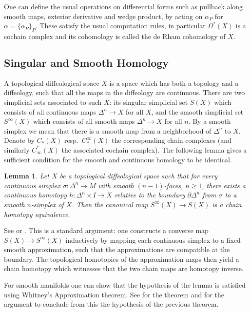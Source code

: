 \documentclass{scrartcl}
\theoremstyle{plain}
\newtheorem{lemma}[theorem]{Lemma}
\theoremstyle{definition}
\begin{document}
One can define the usual operations on differential forms such as pullback along smooth maps, exterior derivative and wedge product, by acting on $\alpha_P$ for $\alpha=\{\alpha_P\}_P$. These satisfy the usual computation rules, in particular $\Omega^*(X)$ is a cochain complex and its cohomology is called the de Rham cohomology of $X$.

\subsection{Singular and Smooth Homology} A topological diffeological space $X$ is a space which has both a topology and a diffeology, such that all the maps in the diffeology are continuous. There are two simplicial sets associated to such $X$: its singular simplicial set $S(X)$ which consists of all continuous maps $\Delta^n\to X$ for all $X$, and the smooth simplicial set $S^\infty(X)$ which consists of all smooth maps $\Delta^n\to X$ for all $n$. By a smooth simplex we mean that there is a smooth map from a neighborhood of $\Delta^n$ to $X$. Denote by $C_*(X)$ resp.\ $C_*^\infty(X)$ the corresponding chain complexes (and similarly $C^*_\infty(X)$ the associated cochain complex). The following lemma gives a sufficient condition for the smooth and continuous homology to be identical.
\begin{lemma}
    Let $X$ be a topological diffeological space such that for every continuous simplex $\sigma\colon \Delta^n\to M$ with smooth $(n-1)$-faces, $n\geq 1$, there exists a continuous homotopy $h\colon \Delta^n\times I\to X$ relative to the boundary $\partial\Delta^n$ from $\sigma$ to a smooth $n$-simplex of $X$. Then the canonical map $S^\infty(X) \to S(X)$ is a chain homotopy equivalence. 
\end{lemma}
See \cite{chen1977iterated} or \cite{parkproof}. This is a standard argument: one constructs a converse map $S(X)\to S^\infty(X)$ inductively by mapping each continuous simplex to a fixed smooth approximation, such that the approximations are compatible at the boundary. The topological homotopies of the approximation maps then yield a chain homotopy which witnesses that the two chain maps are homotopy inverse.

For smooth manifolds one can show that the hypothesis of the lemma is satisfied using Whitney's Approximation theorem. See \cite[Theorem 6.26]{lee2003introduction} for the theorem and \cite{parkproof} for the argument to conclude from this the hypothesis of the previous theorem.
\end{document}

